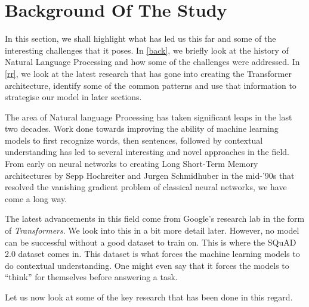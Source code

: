 \documentclass[a4paper,12pt]{report}
\begin{document}
        \section{Background Of The Study}\label{c1background}
        	In this section, we shall highlight what has led us this far and some of the interesting challenges that it poses. In \ref{back}, we briefly look at the history of Natural Language Processing and how some of the challenges were addressed. In \ref{rr}, we look at the latest research that has gone into creating the Transformer architecture, identify some of the common patterns and use that information to strategise our model in later sections.

            The area of Natural language Processing has taken significant leaps in the last two decades. Work done towards improving the ability of machine learning models to first recognize words, then sentences, followed by contextual understanding has led to several interesting and novel approaches in the field. From early on neural networks to creating Long Short-Term Memory architectures \citep{lstmoriginal} by Sepp Hochreiter and Jurgen Schmidhuber in the mid-'90s that resolved the vanishing gradient problem of classical neural networks, we have come a long way.

           The latest advancements in this field come from Google's research lab in the form of \textit{Transformers}. We look into this in a bit more detail later. However, no model can be successful without a good dataset to train on. This is where the SQuAD 2.0 dataset \citep{dataset} comes in. This dataset is what forces the machine learning models to do contextual understanding. One might even say that it forces the models to ``think'' for themselves before answering a task.

           Let us now look at some of the key research that has been done in this regard.
\end{document}
